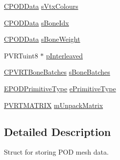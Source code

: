 \begin{DoxyCompactItemize}
\item 
\hyperlink{class_c_p_o_d_data}{C\+P\+O\+D\+Data} \hyperlink{struct_s_p_o_d_mesh_a5b7862953fc6fb42758f69589488feaa}{s\+Vtx\+Colours}
\item 
\hyperlink{class_c_p_o_d_data}{C\+P\+O\+D\+Data} \hyperlink{struct_s_p_o_d_mesh_a381945f44d8d3b9582bc7fef853b7055}{s\+Bone\+Idx}
\item 
\hyperlink{class_c_p_o_d_data}{C\+P\+O\+D\+Data} \hyperlink{struct_s_p_o_d_mesh_afe386a295ca2f8bf7b2348231336f293}{s\+Bone\+Weight}
\item 
P\+V\+R\+Tuint8 $\ast$ \hyperlink{struct_s_p_o_d_mesh_acadf879e8f994efe0c0363a652220c6c}{p\+Interleaved}
\item 
\hyperlink{class_c_p_v_r_t_bone_batches}{C\+P\+V\+R\+T\+Bone\+Batches} \hyperlink{struct_s_p_o_d_mesh_a93a3f52d85cfced3b574ebb58d335f51}{s\+Bone\+Batches}
\item 
\hyperlink{struct_e_p_o_d_primitive_type}{E\+P\+O\+D\+Primitive\+Type} \hyperlink{struct_s_p_o_d_mesh_a4c3421666ba901e6c560906b7f2b16c6}{e\+Primitive\+Type}
\item 
\hyperlink{class_p_v_r_t_m_a_t_r_i_xf}{P\+V\+R\+T\+M\+A\+T\+R\+I\+X} \hyperlink{struct_s_p_o_d_mesh_aec4e642cca903963adccca5198861f00}{m\+Unpack\+Matrix}
\end{DoxyCompactItemize}


\subsection{Detailed Description}
Struct for storing P\+O\+D mesh data. 



 

